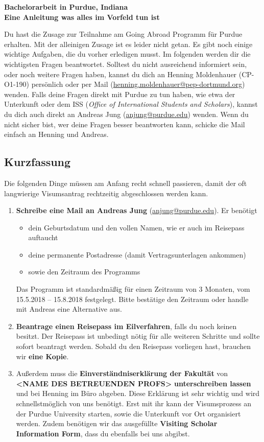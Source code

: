 \documentclass[
  paper=a4,
  fontsize=12pt,
  DIV=16,
  headheight=52pt,
  footheight=45pt,
  headinclude,
  parskip=full,
]{scrartcl}
\date{10. October 2017}
\begin{document}
\textbf{\Huge\sffamily Bachelorarbeit in Purdue, Indiana}\\[0.5\baselineskip]
\textbf{\Large\sffamily Eine Anleitung was alles im Vorfeld tun ist}

Du hast die Zusage zur Teilnahme am Going Abroad Programm für Purdue erhalten.
Mit der alleinigen Zusage ist es leider nicht getan.
Es gibt noch einige wichtige Aufgaben, die du vorher erledigen musst.
Im folgenden werden dir die wichtigsten Fragen beantwortet.
Solltest du nicht ausreichend informiert sein, oder noch weitere Fragen haben,
kannst du dich an Henning Moldenhauer (CP-O1-190) persönlich oder per Mail
(\href{mailto:henning.moldenhauer@pep-dortmund.org}{henning.moldenhauer@pep-dortmund.org}) wenden.
Falls deine Fragen direkt mit Purdue zu tun haben, wie etwa der Unterkunft oder
dem ISS (\textit{Office of International Students and Scholars}), kannst du dich auch direkt an Andreas Jung (\href{mailto:anjung@purdue.edu}{anjung@purdue.edu}) wenden.
Wenn du nicht sicher bist, wer deine Fragen besser beantworten kann, schicke die Mail einfach an Henning und Andreas.


\subsection*{Kurzfassung}
Die folgenden Dinge müssen am Anfang recht schnell passieren, damit der oft langwierige Visumsantrag rechtzeitig abgeschlossen werden kann.
\begin{enumerate}
  \item \textbf{Schreibe eine Mail an Andreas Jung} (\href{mailto:anjung@purdue.edu}{anjung@purdue.edu}).
    Er benötigt
    \begin{itemize}
      \item dein Geburtsdatum und den vollen Namen, wie er auch im Reisepass auftaucht
      \item deine permanente Postadresse (damit Vertragsunterlagen ankommen)
      \item sowie den Zeitraum des Programms
    \end{itemize}
    Das Programm ist standardmäßig für einen Zeitraum von 3 Monaten, vom 15.5.2018 – 15.8.2018 festgelegt.
    Bitte bestätige den Zeitraum oder handle mit Andreas eine Alternative aus.
  \item \textbf{Beantrage einen Reisepass im Eilverfahren}, falls du noch keinen besitzt.
    Der Reisepass ist unbedingt nötig für alle weiteren Schritte und sollte sofort beantragt werden.
    Sobald du den Reisepass vorliegen hast, brauchen wir \textbf{eine Kopie}.
  \item Außerdem muss die \textbf{Einverständniserklärung der Fakultät} von \textbf{<NAME DES BETREUENDEN PROFS>} \textbf{unterschreiben lassen} und bei Henning im Büro abgeben.
  Diese Erklärung ist sehr wichtig und wird schnellstmöglich von uns benötigt.
  Erst mit ihr kann der Visumsprozess an der Purdue University starten, sowie die Unterkunft vor Ort organisiert werden.
  Zudem benötigen wir das ausgefüllte \textbf{Visiting Scholar Information Form}, dass du ebenfalls bei uns abgibst.
\end{enumerate}
\end{document}
